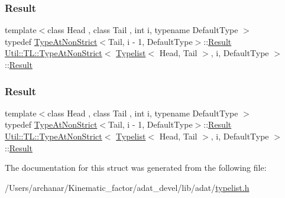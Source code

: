 \subsubsection{\texorpdfstring{Result}{Result}\hspace{0.1cm}{\footnotesize\ttfamily [1/2]}}
{\footnotesize\ttfamily template$<$class Head , class Tail , int i, typename Default\+Type $>$ \\
typedef \mbox{\hyperlink{structUtil_1_1TL_1_1TypeAtNonStrict}{Type\+At\+Non\+Strict}}$<$Tail, i -\/ 1, Default\+Type$>$\+::\mbox{\hyperlink{structUtil_1_1TL_1_1TypeAtNonStrict_3_01Typelist_3_01Head_00_01Tail_01_4_00_01i_00_01DefaultType_01_4_a8373e5740e40b58eb026277b65fdd1de}{Result}} \mbox{\hyperlink{structUtil_1_1TL_1_1TypeAtNonStrict}{Util\+::\+T\+L\+::\+Type\+At\+Non\+Strict}}$<$ \mbox{\hyperlink{structUtil_1_1Typelist}{Typelist}}$<$ Head, Tail $>$, i, Default\+Type $>$\+::\mbox{\hyperlink{structUtil_1_1TL_1_1TypeAtNonStrict_3_01Typelist_3_01Head_00_01Tail_01_4_00_01i_00_01DefaultType_01_4_a8373e5740e40b58eb026277b65fdd1de}{Result}}}

\mbox{\label{structUtil_1_1TL_1_1TypeAtNonStrict_3_01Typelist_3_01Head_00_01Tail_01_4_00_01i_00_01DefaultType_01_4_a8373e5740e40b58eb026277b65fdd1de}} 
\subsubsection{\texorpdfstring{Result}{Result}\hspace{0.1cm}{\footnotesize\ttfamily [2/2]}}
{\footnotesize\ttfamily template$<$class Head , class Tail , int i, typename Default\+Type $>$ \\
typedef \mbox{\hyperlink{structUtil_1_1TL_1_1TypeAtNonStrict}{Type\+At\+Non\+Strict}}$<$Tail, i -\/ 1, Default\+Type$>$\+::\mbox{\hyperlink{structUtil_1_1TL_1_1TypeAtNonStrict_3_01Typelist_3_01Head_00_01Tail_01_4_00_01i_00_01DefaultType_01_4_a8373e5740e40b58eb026277b65fdd1de}{Result}} \mbox{\hyperlink{structUtil_1_1TL_1_1TypeAtNonStrict}{Util\+::\+T\+L\+::\+Type\+At\+Non\+Strict}}$<$ \mbox{\hyperlink{structUtil_1_1Typelist}{Typelist}}$<$ Head, Tail $>$, i, Default\+Type $>$\+::\mbox{\hyperlink{structUtil_1_1TL_1_1TypeAtNonStrict_3_01Typelist_3_01Head_00_01Tail_01_4_00_01i_00_01DefaultType_01_4_a8373e5740e40b58eb026277b65fdd1de}{Result}}}



The documentation for this struct was generated from the following file\+:\begin{DoxyCompactItemize}
\item 
/\+Users/archanar/\+Kinematic\+\_\+factor/adat\+\_\+devel/lib/adat/\mbox{\hyperlink{lib_2adat_2typelist_8h}{typelist.\+h}}\end{DoxyCompactItemize}
